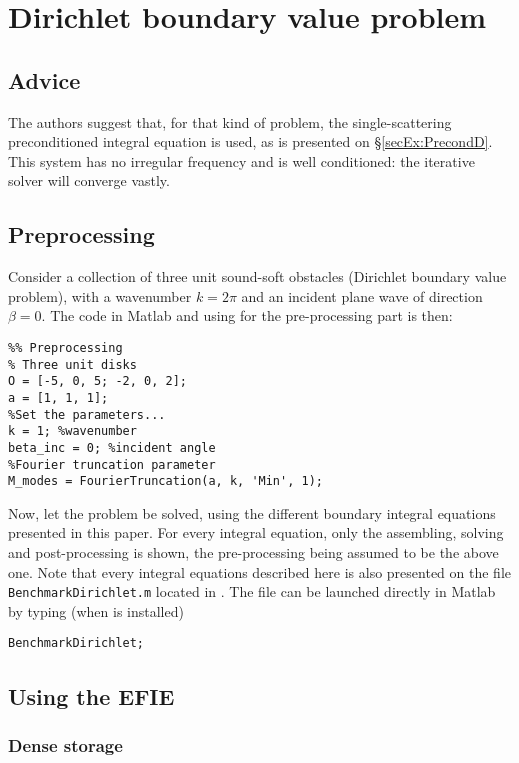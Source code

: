 
\section{Dirichlet boundary value problem}

\subsection{Advice}

The authors suggest that, for that kind of problem, the single-scattering preconditioned integral equation is used, as is presented on \S\ref{secEx:PrecondD}. This system has no irregular frequency and is well conditioned: the iterative solver will converge vastly.

\subsection{Preprocessing}

Consider a collection of three unit sound-soft obstacles (Dirichlet boundary value problem), with a wavenumber $k=2\pi$ and an incident plane wave of direction $\beta = 0$. The code in Matlab and using \mudiff for the pre-processing part is then:
\begin{lstlisting}
%% Preprocessing
% Three unit disks 
O = [-5, 0, 5; -2, 0, 2];
a = [1, 1, 1];
%Set the parameters...
k = 1; %wavenumber
beta_inc = 0; %incident angle
%Fourier truncation parameter
M_modes = FourierTruncation(a, k, 'Min', 1);
\end{lstlisting}

Now, let the problem be solved, using the different boundary integral equations presented in this paper. For every integral equation, only the assembling, solving and post-processing is shown, the pre-processing being assumed to be the above one. Note that every integral equations described here is also presented on the file \texttt{BenchmarkDirichlet.m} located in . The file can be launched directly in Matlab by typing (when \mudiff is installed)
\begin{lstlisting}
BenchmarkDirichlet;
\end{lstlisting}

\subsection{Using the EFIE}

\subsubsection{Dense storage}

